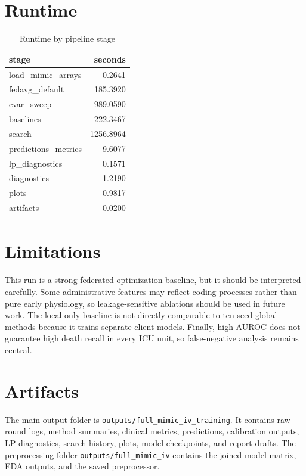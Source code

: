 \documentclass[11pt]{article}
\begin{document}
\section{Runtime}
\begin{table}[H]
\centering
\caption{Runtime by pipeline stage}
\label{tab:runtime}
\begin{tabular}{lr}
\toprule
stage & seconds \\
\midrule
load\_mimic\_arrays & 0.2641 \\
fedavg\_default & 185.3920 \\
cvar\_sweep & 989.0590 \\
baselines & 222.3467 \\
search & 1256.8964 \\
predictions\_metrics & 9.6077 \\
lp\_diagnostics & 0.1571 \\
diagnostics & 1.2190 \\
plots & 0.9817 \\
artifacts & 0.0200 \\
\bottomrule
\end{tabular}
\end{table}

\section{Limitations}
This run is a strong federated optimization baseline, but it should be interpreted carefully. Some administrative features may reflect coding processes rather than pure early physiology, so leakage-sensitive ablations should be used in future work. The local-only baseline is not directly comparable to ten-seed global methods because it trains separate client models. Finally, high AUROC does not guarantee high death recall in every ICU unit, so false-negative analysis remains central.

\section{Artifacts}
The main output folder is \texttt{outputs/full\_mimic\_iv\_training}. It contains raw round logs, method summaries, clinical metrics, predictions, calibration outputs, LP diagnostics, search history, plots, model checkpoints, and report drafts. The preprocessing folder \texttt{outputs/full\_mimic\_iv} contains the joined model matrix, EDA outputs, and the saved preprocessor.
\end{document}
